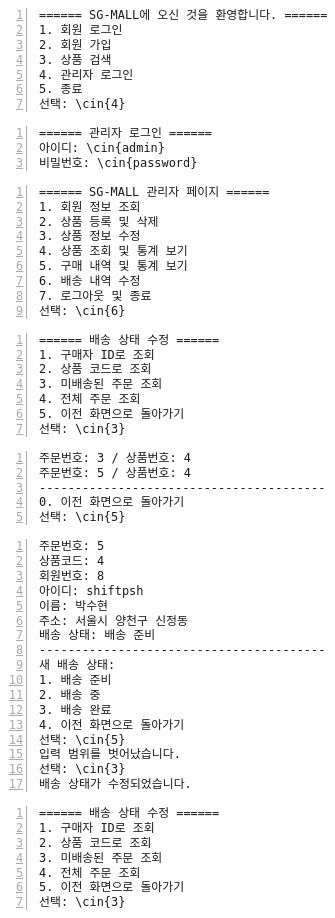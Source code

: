 \documentclass[runningheads]{llncs}
\newcommand{\cin}[1]{\textbf{\textcolor{orange}{#1}}}
\begin{document}
\begin{Verbatim}[frame=single,numbers=left,commandchars=\\\{\}]
====== SG-MALL에 오신 것을 환영합니다. ======
1. 회원 로그인
2. 회원 가입
3. 상품 검색
4. 관리자 로그인
5. 종료
선택: \cin{4}
\end{Verbatim}

\begin{Verbatim}[frame=single,numbers=left,commandchars=\\\{\}]
====== 관리자 로그인 ======
아이디: \cin{admin}
비밀번호: \cin{password}
\end{Verbatim}

\begin{Verbatim}[frame=single,numbers=left,commandchars=\\\{\}]
====== SG-MALL 관리자 페이지 ======
1. 회원 정보 조회
2. 상품 등록 및 삭제
3. 상품 정보 수정
4. 상품 조회 및 통계 보기
5. 구매 내역 및 통계 보기
6. 배송 내역 수정
7. 로그아웃 및 종료
선택: \cin{6}
\end{Verbatim}

\begin{Verbatim}[frame=single,numbers=left,commandchars=\\\{\}]
====== 배송 상태 수정 ======
1. 구매자 ID로 조회
2. 상품 코드로 조회
3. 미배송된 주문 조회
4. 전체 주문 조회
5. 이전 화면으로 돌아가기
선택: \cin{3}
\end{Verbatim}

\begin{Verbatim}[frame=single,numbers=left,commandchars=\\\{\}]
주문번호: 3 / 상품번호: 4
주문번호: 5 / 상품번호: 4
----------------------------------------
0. 이전 화면으로 돌아가기
선택: \cin{5}
\end{Verbatim}

\begin{Verbatim}[frame=single,numbers=left,commandchars=\\\{\}]
주문번호: 5
상품코드: 4
회원번호: 8
아이디: shiftpsh
이름: 박수현
주소: 서울시 양천구 신정동
배송 상태: 배송 준비
----------------------------------------
새 배송 상태:
1. 배송 준비
2. 배송 중
3. 배송 완료
4. 이전 화면으로 돌아가기
선택: \cin{5}
입력 범위를 벗어났습니다.
선택: \cin{3}
배송 상태가 수정되었습니다.
\end{Verbatim}

\begin{Verbatim}[frame=single,numbers=left,commandchars=\\\{\}]
====== 배송 상태 수정 ======
1. 구매자 ID로 조회
2. 상품 코드로 조회
3. 미배송된 주문 조회
4. 전체 주문 조회
5. 이전 화면으로 돌아가기
선택: \cin{3}
\end{Verbatim}
\end{document}
